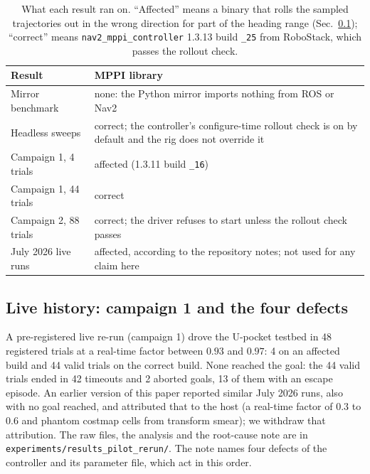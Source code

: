 \documentclass[journal]{IEEEtran}
\begin{document}
\begin{table}[t]
\centering
\caption{What each result ran on. ``Affected'' means a binary that rolls the
sampled trajectories out in the wrong direction for part of the heading range
(Sec.~\ref{sec:history}); ``correct'' means \texttt{nav2\_mppi\_controller}
1.3.13 build \texttt{\_25} from RoboStack, which passes the rollout check.}
\label{tab:builds}
\footnotesize
\setlength{\tabcolsep}{3pt}
\begin{tabular}{p{}p{}}
\toprule
Result & MPPI library \\
\midrule
Mirror benchmark & none: the Python mirror imports nothing from ROS or Nav2 \\
Headless sweeps & correct; the controller's configure-time rollout check is on by default and the rig does not override it \\
Campaign 1, 4 trials & affected (1.3.11 build \texttt{\_16}) \\
Campaign 1, 44 trials & correct \\
Campaign 2, 88 trials & correct; the driver refuses to start unless the rollout check passes \\
July 2026 live runs & affected, according to the repository notes; not used for any claim here \\
\bottomrule
\end{tabular}
\end{table}

\subsection{Live history: campaign 1 and the four defects}
\label{sec:history}

A pre-registered live re-run (campaign 1) drove the U-pocket testbed in 48
registered trials at a real-time factor between $0.93$ and $0.97$: 4 on an
affected build and 44 valid trials on the correct build. None reached the
goal: the 44 valid trials ended in 42 timeouts and 2 aborted goals, 13 of
them with an escape episode. An earlier version of this paper reported
similar July 2026 runs, also with no goal reached, and attributed that to the
host (a real-time factor of $0.3$ to $0.6$ and phantom costmap cells from
transform smear); we withdraw that attribution. The
raw files, the analysis and the root-cause note are in
\texttt{experiments/results\_pilot\_rerun/}. The note names four defects of the
controller and its parameter file, which act in this order.
\end{document}
